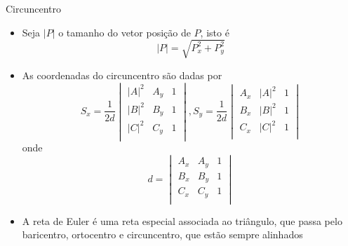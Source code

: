 \begin{frame}[fragile]{Circuncentro}

    \begin{itemize}
        \item Seja $|P|$ o tamanho do vetor posição de $P$, isto é
        \[
            |P| = \sqrt{P_x^2 + P_y^2}
        \]
        \pause

        \item As coordenadas do circuncentro são dadas por
        \[
            S_x = \frac{1}{2d} \begin{vmatrix}
                |A|^2 & A_y & 1 \\
                |B|^2 & B_y & 1 \\
                |C|^2 & C_y & 1 \\
            \end{vmatrix}, S_y = \frac{1}{2d} \begin{vmatrix}
                A_x & |A|^2 & 1 \\
                B_x & |B|^2 & 1 \\
                C_x & |C|^2 & 1 \\
            \end{vmatrix}
        \]
        onde
        \[
            d = \begin{vmatrix}
                A_x & A_y & 1 \\
                B_x & B_y & 1 \\
                C_x & C_y & 1 \\
            \end{vmatrix}
        \]
        \pause

        \item A reta de Euler é uma reta especial associada ao triângulo, que passa pelo baricentro, ortocentro e circuncentro, que estão sempre alinhados
    \end{itemize}

\end{frame}

